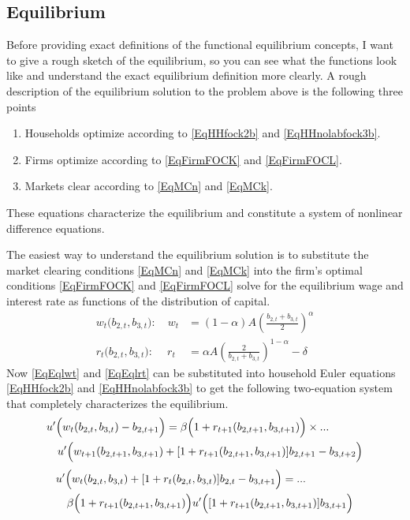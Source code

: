 \documentclass[letterpaper,12pt]{article}
\theoremstyle{definition}
\numberwithin{equation}{section}
\numberwithin{exercise}{section}
\begin{document}
\begin{spacing}{1.5}
   \subsection{Equilibrium}\label{Sec3perSimpEqlb}

      Before providing exact definitions of the functional equilibrium concepts, I want to give a rough sketch of the equilibrium, so you can see what the functions look like and understand the exact equilibrium definition more clearly. A rough description of the equilibrium solution to the problem above is the following three points
      \begin{enumerate}
         \item Households optimize according to \eqref{EqHHfock2b} and \eqref{EqHHnolabfock3b}.
         \item Firms optimize according to \eqref{EqFirmFOCK} and \eqref{EqFirmFOCL}.
         \item Markets clear according to \eqref{EqMCn} and \eqref{EqMCk}.
      \end{enumerate}
      These equations characterize the equilibrium and constitute a system of nonlinear difference equations.

      The easiest way to understand the equilibrium solution is to substitute the  market clearing conditions \eqref{EqMCn} and \eqref{EqMCk} into the firm's optimal conditions \eqref{EqFirmFOCK} and \eqref{EqFirmFOCL} solve for the equilibrium wage and interest rate as functions of the distribution of capital.
      \begin{align}
         w_t\bigl(b_{2,t},b_{3,t}\bigr):\quad w_t &= (1-\alpha)A\left(\frac{b_{2,t}+b_{3,t}}{2}\right)^\alpha \label{EqEqlwt} \\
         r_t\bigl(b_{2,t},b_{3,t}\bigr):\:\quad r_t &= \alpha A\left(\frac{2}{b_{2,t}+b_{3,t}}\right)^{1-\alpha} - \delta \label{EqEqlrt}
      \end{align}
      Now \eqref{EqEqlwt} and \eqref{EqEqlrt} can be substituted into household Euler equations \eqref{EqHHfock2b} and \eqref{EqHHnolabfock3b} to get the following two-equation system that completely characterizes the equilibrium.
      \begin{equation}\label{EqEqlfock2}
         \begin{split}
            &u'\Bigl(w_t(b_{2,t},b_{3,t}) - b_{2,t+1}\Bigr) = \beta\Bigl(1 + r_{t+1}(b_{2,t+1},b_{3,t+1})\Bigr) \times... \\
            &\quad u'\Bigl(w_{t+1}(b_{2,t+1},b_{3,t+1}) + [1 + r_{t+1}(b_{2,t+1},b_{3,t+1})]b_{2,t+1} - b_{3,t+2}\Bigr)
         \end{split}
      \end{equation}
      \begin{equation}\label{EqEqlfock3}
         \begin{split}
            &u'\Bigl(w_t(b_{2,t},b_{3,t}) + [1 + r_t(b_{2,t},b_{3,t})]b_{2,t} - b_{3,t+1}\Bigr) = ... \\
            &\quad \beta\Bigl(1 + r_{t+1}(b_{2,t+1},b_{3,t+1})\Bigr)u'\Bigl([1 + r_{t+1}(b_{2,t+1},b_{3,t+1})]b_{3,t+1}\Bigr)
         \end{split}
      \end{equation}


\end{spacing}
\end{document}
